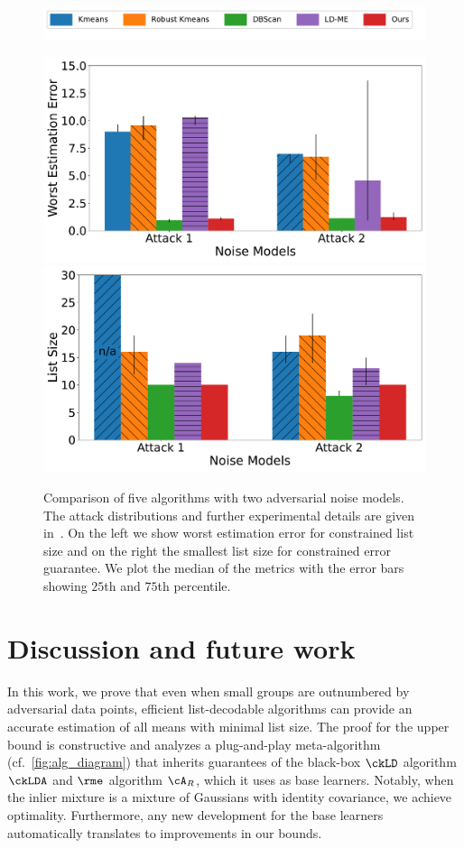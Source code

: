 \begin{figure}[t]
    \centering
    \begin{minipage}[t]{0.8\linewidth}
        \includegraphics[width=0.99\linewidth]{chapters/robust/figures/new_legend.pdf}
        \end{minipage}
    \begin{minipage}[t]{\linewidth}
        \includegraphics[width=0.49\linewidth]{chapters/robust/figures/gauss_inliers_2_attacks_error.pdf}
        \includegraphics[width=0.49\linewidth]{chapters/robust/figures/gauss_inliers_2_attacks_size.pdf}
    \end{minipage}
    \caption{
    Comparison of five algorithms with two adversarial noise models. The attack distributions and further experimental details are given in~. On the left we show worst estimation error for constrained list size and on the right the smallest list size for constrained error guarantee.
    We plot the median of the metrics with the error bars showing \(25\)th and \(75\)th percentile.
    }
    \label{fig:list_size}
\end{figure}
\vspace{-0.1in}
\section{Discussion and future work}
\label{sec:exp}


In this work, we prove that even when small groups are outnumbered by adversarial data points, efficient list-decodable algorithms can provide an accurate estimation of all means with minimal list size. 
The proof for the upper bound is constructive and analyzes a plug-and-play meta-algorithm  (cf.~\cref{fig:alg_diagram}) that inherits guarantees of the black-box $\ckLD$ algorithm $\ckLDA$ and $\rme$ algorithm $\cA_R$, which it uses as base learners. 
Notably, when the inlier mixture is a mixture of Gaussians with identity covariance, we achieve optimality.
Furthermore, any new development for the base learners
automatically translates to improvements in our bounds.

